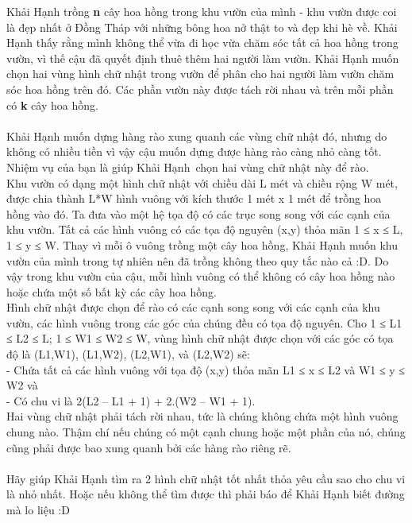 Khải Hạnh trồng \textbf{ n } cây hoa hồng trong khu vườn của mình - khu vườn được coi là đẹp nhất ở Đồng Tháp với những bông hoa nở thật to và đẹp khi hè về. Khải Hạnh thấy rằng mình không thể vừa đi học vừa chăm sóc tất cả hoa hồng trong vườn, vì thế cậu đã quyết định thuê thêm hai người làm vườn. Khải Hạnh muốn chọn hai vùng hình chữ nhật trong vườn để phân cho hai người làm vườn chăm sóc hoa hồng trên đó. Các phần vườn này được tách rời nhau và trên mỗi phần có \textbf{ k } cây hoa hồng.
\\
\\Khải Hạnh muốn dựng hàng rào xung quanh các vùng chữ nhật đó, nhưng do không có nhiều tiền vì vậy cậu muốn dựng được hàng rào càng nhỏ càng tốt. Nhiệm vụ của bạn là giúp Khải Hạnh chọn hai vùng chữ nhật này để rào.
\\Khu vườn có dạng một hình chữ nhật với chiều dài L mét và chiều rộng W mét, được chia thành L*W hình vuông với kích thước 1 mét x 1 mét để trồng hoa hồng vào đó. Ta đưa vào một hệ tọa độ có các trục song song với các cạnh của khu vườn. Tất cả các hình vuông có các tọa độ nguyên (x,y) thỏa mãn 1 ≤ x ≤ L, 1 ≤ y ≤ W. Thay vì mỗi ô vuông trồng một cây hoa hồng, Khải Hạnh muốn khu vườn của mình trong tự nhiên nên đã trồng không theo quy tắc nào cả :D. Do vậy trong khu vườn của cậu, mỗi hình vuông có thể không có cây hoa hồng nào hoặc chứa một số bất kỳ các cây hoa hồng.
\\Hình chữ nhật được chọn để rào có các cạnh song song với các cạnh của khu vườn, các hình vuông trong các góc của chúng đều có tọa độ nguyên. Cho 1 ≤ L1 ≤ L2 ≤ L; 1 ≤ W1 ≤ W2 ≤ W, vùng hình chữ nhật được chọn với các góc có tọa độ là (L1,W1), (L1,W2), (L2,W1), và (L2,W2) sẽ:
\\- Chứa tất cả các hình vuông với tọa độ (x,y) thỏa mãn L1 ≤ x ≤ L2 và W1 ≤ y ≤ W2 và
\\- Có chu vi là 2(L2 – L1 + 1) + 2.(W2 – W1 + 1).
\\Hai vùng chữ nhật phải tách rời nhau, tức là chúng không chứa một hình vuông chung nào. Thậm chí nếu chúng có một cạnh chung hoặc một phần của nó, chúng cũng phải được bao xung quanh bởi các hàng rào riêng rẽ.
\\
\\Hãy giúp Khải Hạnh tìm ra 2 hình chữ nhật tốt nhất thỏa yêu cầu sao cho chu vi là nhỏ nhất. Hoặc nếu không thể tìm được thì phải báo để Khải Hạnh biết đường mà lo liệu :D